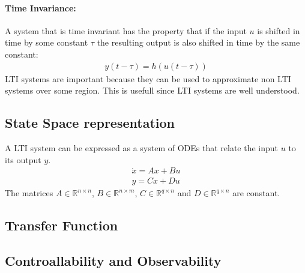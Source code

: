 \paragraph{Time Invariance:}
A system that is time invariant has the property that if the input \(u\) is shifted in time by some constant \(\tau\) the resulting output is also shifted in time by the same constant:
\begin{gather}
y(t - \tau) = h(u(t-\tau))
\end{gather}
LTI systems are important because they can be used to approximate non LTI systems over some region.
This is usefull since LTI systems are well understood.
\cite{DouglasB}
\subsection{State Space representation}
A LTI system can be expressed as a system of ODEs that relate the input \(u\) to its output \(y\).
\begin{gather}
\dot{x} = Ax + Bu \\
y = Cx + Du
\end{gather}
The matrices \(A \in \mathbb{R}^{n \times n}\),
\(B \in \mathbb{R}^{n \times m}\),
\(C \in \mathbb{R}^{q \times n}\) and
\(D \in \mathbb{R}^{q \times n}\) are constant.

\subsection{Transfer Function}
\subsection{Controallability and Observability}


